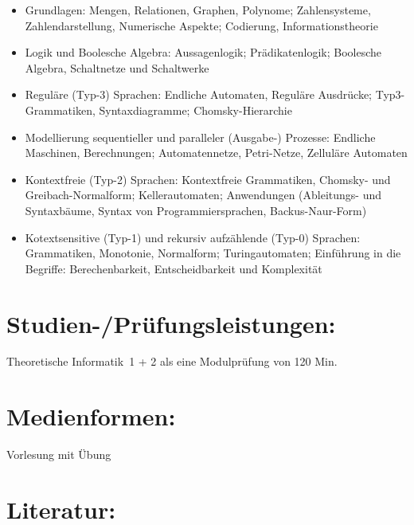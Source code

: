 \begin{itemize}
\item
  Grundlagen: Mengen, Relationen, Graphen, Polynome; Zahlensysteme,
  Zahlendarstellung, Numerische Aspekte; Codierung, Informationstheorie
\item
  Logik und Boolesche Algebra: Aussagenlogik; Prädikatenlogik; Boolesche
  Algebra, Schaltnetze und Schaltwerke
\item
  Reguläre (Typ-3) Sprachen: Endliche Automaten, Reguläre Ausdrücke;
  Typ3-Grammatiken, Syntaxdiagramme; Chomsky-Hierarchie
\item
  Modellierung sequentieller und paralleler (Ausgabe-) Prozesse:
  Endliche Maschinen, Berechnungen; Automatennetze, Petri-Netze,
  Zelluläre Automaten
\item
  Kontextfreie (Typ-2) Sprachen: Kontextfreie Grammatiken, Chomsky- und
  Greibach-Normalform; Kellerautomaten; Anwendungen (Ableitungs- und
  Syntaxbäume, Syntax von Programmiersprachen, Backus-Naur-Form)
\item
  Kotextsensitive (Typ-1) und rekursiv aufzählende (Typ-0) Sprachen:
  Grammatiken, Monotonie, Normalform; Turingautomaten; Einführung in die
  Begriffe: Berechenbarkeit, Entscheidbarkeit und Komplexität
\end{itemize}

\section{Studien-/Prüfungsleistungen:}\label{studien-pruxfcfungsleistungen-27}

Theoretische Informatik~1 + 2 als eine Modulprüfung von 120 Min.

\section{Medienformen:}\label{medienformen-27}

Vorlesung mit Übung

\section{Literatur:}\label{literatur-27}

